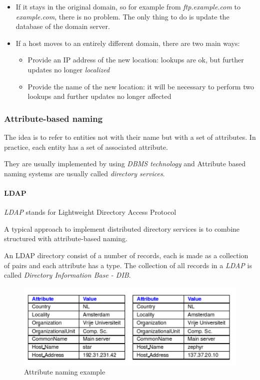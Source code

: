 \begin{itemize}
\item
  If it stays in the original domain, so for example from
  \emph{ftp.example.com} to \emph{example.com}, there is no problem. The
  only thing to do is update the database of the domain server.
\item
  If a host moves to an entirely different domain, there are two main
  ways:
  \begin{itemize}
    \item
      Provide an IP address of the new location: lookups are ok, but further
      updates no longer \textit{localized}
    \item
      Provide the name of the new location: it will be necessary to perform
      two lookups and further updates no longer affected
  \end{itemize}
\end{itemize}

\subsubsection{Attribute-based naming}

The idea is to refer to entities not with their name but with a set of
attributes. In practice, each entity has a set of associated attribute.

They are usually implemented by using \emph{DBMS technology} and
Attribute based naming systems are usually called \emph{directory
services}.

\paragraph{LDAP}
\textit{LDAP} stands for Lightweight Directory Access Protocol

A typical approach to implement distributed directory services is to
combine structured with attribute-based naming.

An LDAP directory consist of a number of records, each is made as a
collection of \emph{} pairs and each attribute has a type. The
collection of all records in a \emph{LDAP} is called \emph{Directory
Information Base - DIB}.

\begin{figure}[h]
    \caption{Attribute naming example}
    \includegraphics[width=\textwidth]{src/images/attribute-naming.png}
    \centering
\end{figure}

